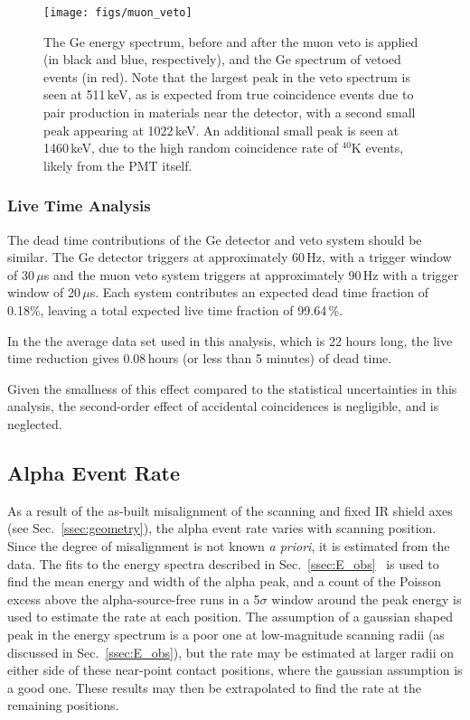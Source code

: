 \documentclass[groupedaddress,rmp,amsmath,amssymb,bibnotes,altaffilletter,twocolumn]{revtex4-1}
\begin{document}
\begin{figure}[h]
 \centering
 \texttt{[image: figs/muon\_veto]}
 \caption{The Ge energy spectrum, before and after the muon veto is applied (in black and blue, respectively), and the Ge spectrum of vetoed events (in red). Note that the largest peak in the veto spectrum is seen at 511\,keV, as is expected from true coincidence events due to pair production in materials near the detector, with a second small peak appearing at 1022\,keV. An additional small peak is seen at 1460\,keV, due to the high random coincidence rate of $^{40}$K events, likely from the PMT itself.}
 \label{fig:muVeto}
\end{figure}

\subsubsection{Live Time Analysis}
The dead time contributions of the Ge detector and veto system should be similar. The Ge detector triggers at approximately 60\,Hz, with a trigger window of 30\,$\mu$s and the muon veto system triggers at approximately 90\,Hz with a trigger window of 20\,$\mu$s. Each system contributes an expected dead time fraction of 0.18\%, leaving a total expected live time fraction of 99.64\,\%. 

In the the average data set used in this analysis, which is 22 hours long, the live time reduction gives 0.08\,hours (or less than 5 minutes) of dead time. 

Given the smallness of this effect compared to the statistical uncertainties in this analysis, the second-order effect of accidental coincidences is negligible, and is neglected.  

\subsection{Alpha Event Rate}\label{ssec:rate}
As a result of the as-built misalignment of the scanning and fixed IR shield axes (see Sec.~\ref{ssec:geometry}), the alpha event rate varies with scanning position. Since the degree of misalignment is not known {\it a priori}, it is estimated from the data. The fits to the energy spectra described in Sec.~\ref{ssec:E_obs}~ is used to find the mean energy and width of the alpha peak, and a count of the Poisson excess above the alpha-source-free runs in a 5$\sigma$ window around the peak energy is used to estimate the rate at each position. The assumption of a gaussian shaped peak in the energy spectrum is a poor one at low-magnitude scanning radii (as discussed in Sec.~\ref{ssec:E_obs}), but the rate may be estimated at larger radii on either side of these near-point contact positions, where the gaussian assumption is a good one. These results may then be extrapolated to find the rate at the remaining positions. 
\end{document}
